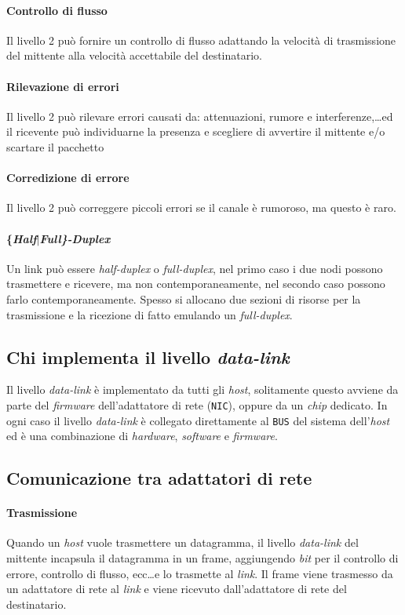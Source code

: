         \paragraph{Controllo di flusso} Il livello 2 può fornire un controllo di flusso adattando la velocità di trasmissione del mittente alla velocità accettabile del destinatario.
        \paragraph{Rilevazione di errori} Il livello 2 può rilevare errori causati da: attenuazioni, rumore e interferenze,\dots ed il ricevente può individuarne la presenza e scegliere di avvertire il mittente e/o scartare il pacchetto
        \paragraph{Corredizione di errore} Il livello 2 può correggere piccoli errori se il canale è rumoroso, ma questo è raro.
        \paragraph{\{\textit{Half}$\mid$\textit{Full\}-Duplex}} Un link può essere \textit{half-duplex} o \textit{full-duplex}, nel primo caso i due nodi possono trasmettere e ricevere, ma non contemporaneamente, nel secondo caso possono farlo contemporaneamente. Spesso si allocano due sezioni di risorse per la trasmissione e la ricezione di fatto emulando un \textit{full-duplex}.
    \subsection{Chi implementa il livello \textit{data-link}}
        Il livello \textit{data-link} è implementato da tutti gli \textit{host}, solitamente questo avviene da parte del \textit{firmware} dell'adattatore di rete (\texttt{NIC}), oppure da un \textit{chip} dedicato. In ogni caso il livello \textit{data-link} è collegato direttamente al \texttt{BUS} del sistema dell'\textit{host} ed è una combinazione di \textit{hardware}, \textit{software} e \textit{firmware}.
    \subsection{Comunicazione tra adattatori di rete} 
        \paragraph{Trasmissione} Quando un \textit{host} vuole trasmettere un datagramma, il livello \textit{data-link} del mittente incapsula il datagramma in un frame, aggiungendo \textit{bit} per il controllo di errore, controllo di flusso, ecc\dots e lo trasmette al \textit{link}. Il frame viene trasmesso da un adattatore di rete al \textit{link} e viene ricevuto dall'adattatore di rete del destinatario.
